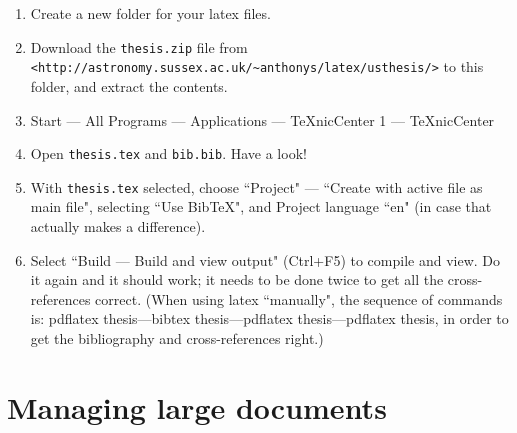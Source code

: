 \documentclass[a4paper]{article}
\begin{document}
\begin{enumerate}
  \item Create a new folder for your latex files.
  \item Download the \verb=thesis.zip= file from \verb=<http://astronomy.sussex.ac.uk/~anthonys/latex/usthesis/>= to this folder, and extract the contents.
  \item Start --- All Programs --- Applications --- TeXnicCenter 1 --- TeXnicCenter
  \item Open \verb=thesis.tex= and \verb=bib.bib=. Have a look!
  \item With \verb=thesis.tex= selected, choose ``Project" --- ``Create with active file as main file", selecting ``Use BibTeX", and Project language ``en" (in case that actually makes a difference).
  \item Select ``Build --- Build and view output" (Ctrl+F5) to compile and view. Do it again and it should work; it needs to be done twice to get all the cross-references correct. (When using latex ``manually", the sequence of commands is: pdflatex thesis---bibtex thesis---pdflatex thesis---pdflatex thesis, in order to get the bibliography and cross-references right.)
\end{enumerate}

\section{Managing large documents}
\end{document}
